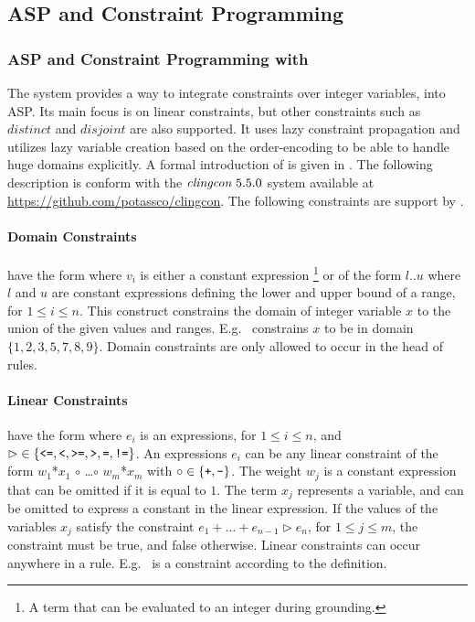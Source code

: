 \subsection{ASP and Constraint Programming}\label{sec:constraint}

\subsubsection{ASP and Constraint Programming with \clingcon}
\label{sec:clingcon}

The \clingcon{} system provides a way to integrate constraints over integer variables, into ASP.
Its main focus is on linear constraints, but other constraints such as $distinct$ and $disjoint$ are also supported.
It uses lazy constraint propagation and utilizes lazy variable creation based on the order-encoding to be able to handle huge domains explicitly.
A formal introduction of \clingcon{} is given in \cite{bakaossc16a}.
%
The following description is conform with the $\clingcon\ 5.5.0$ system available at \url{https://github.com/potassco/clingcon}.
%
The following constraints are support by \clingcon.

\paragraph{Domain Constraints} have the form
 where $v_i$ is either a constant expression%
\footnote{A term that can be evaluated to an integer during grounding.}
or of the form $l$..$u$ where $l$ and $u$ are constant expressions defining the lower and upper bound of a range, for $1\leq i\leq n$.
This construct constrains the domain of integer variable $x$ to the union of the given values and ranges.
E.g.~ constrains $x$ to be in domain $\{1,2,3,5,7,8,9\}$.
Domain constraints are only allowed to occur in the head of rules.

\paragraph{Linear Constraints} have the form
where $e_i$ is an expressions, for $1\leq i\leq n$, 
and $\rhd \in \{\texttt{<=},\texttt{<},\texttt{>=},\texttt{>},\texttt{=},\texttt{!=}\}$.
An expressions $e_i$ can be any linear constraint of the form $w_1$*$x_1$ $\circ$ \text{ }\dots $\circ$ \text{ }$w_m$*$x_m$
with $\circ \in \{\texttt{+}, \texttt{-}\}$.
The weight $w_j$ is a constant expression that can be omitted if it is equal to $1$.
The term $x_j$ represents a variable, and can be omitted to express a constant in the linear expression.
If the values of the variables $x_j$ satisfy the constraint $e_1+\dots+e_{n-1} \rhd e_{n}$,
for $1\leq j\leq m$, the constraint must be true, and false otherwise.
Linear constraints can occur anywhere in a rule.
E.g.~ is a constraint according to the definition.


